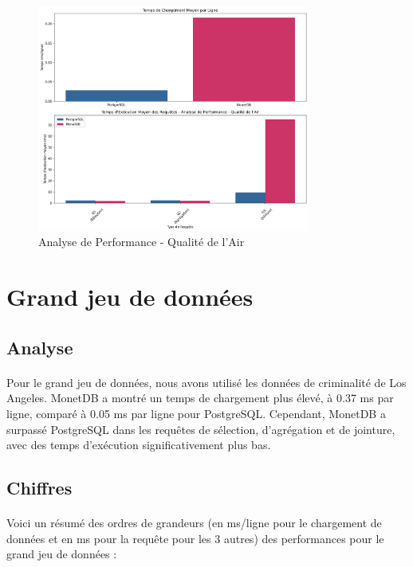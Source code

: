 \documentclass[11pt]{extarticle}
\begin{document}
  \begin{figure}[H]
      \centering
      \includegraphics[width=0.8\textwidth]{images/air_quality_performance.png}
      \caption{Analyse de Performance - Qualité de l'Air}
      \label{fig:performance_air_quality}
  \end{figure}

\section{Grand jeu de données}
\subsection{Analyse}
\paragraph{}
Pour le grand jeu de données, nous avons utilisé les données de criminalité de Los Angeles. MonetDB a montré un temps de chargement plus élevé, à 0.37 ms par ligne, comparé à 0.05 ms par ligne pour PostgreSQL. Cependant, MonetDB a surpassé PostgreSQL dans les requêtes de sélection, d'agrégation et de jointure, avec des temps d'exécution significativement plus bas.

\subsection{Chiffres}
\paragraph{}
Voici un résumé des ordres de grandeurs (en ms/ligne pour le chargement de données et en ms pour la requête pour les 3 autres) des performances pour le grand jeu de données :
\end{document}

